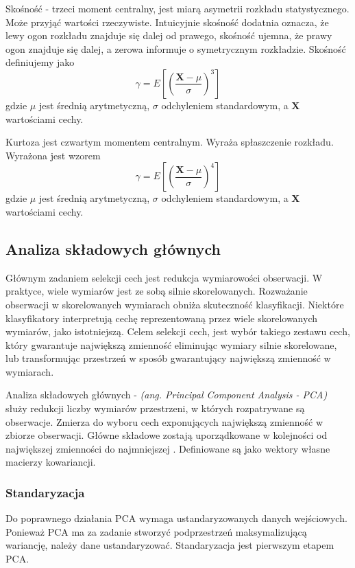\documentclass[a4paper,12pt,twoside,openany]{report}
\newcommand{\ang}[1]{\textit{(ang. #1)}}
\renewcommand{\vec}[1]{\bm{#1}}
\begin{document}
Skośność - trzeci moment centralny, jest miarą asymetrii rozkładu statystycznego. 
Może przyjąć wartości rzeczywiste.
Intuicyjnie skośność dodatnia oznacza, że lewy ogon rozkładu znajduje się dalej od prawego,
skośność ujemna, że prawy ogon znajduje się dalej,
a zerowa informuje o symetrycznym rozkładzie.
Skośność definiujemy jako
\begin{equation}
	\gamma = E \left [ \left (  \frac{\vec X - \mu}{ \sigma }   \right )^3 \right ]
\end{equation}
gdzie $\mu$ jest średnią arytmetyczną, $\sigma$ odchyleniem standardowym, a $\vec X$ wartościami cechy.

Kurtoza jest czwartym momentem centralnym.
Wyraża spłaszczenie rozkładu. 
Wyrażona jest wzorem
\begin{equation}
	\gamma = E \left [ \left (  \frac{\vec X - \mu}{ \sigma }   \right )^4 \right ]
\end{equation}
gdzie $\mu$ jest średnią arytmetyczną, $\sigma$ odchyleniem standardowym, a $\vec X$ wartościami cechy.
\subsection{Analiza składowych głównych}\label{sec:pca}
Głównym zadaniem selekcji cech jest redukcja wymiarowości obserwacji.
W praktyce, wiele wymiarów jest ze sobą silnie skorelowanych.
Rozważanie obserwacji w skorelowanych wymiarach obniża skuteczność klasyfikacji.
Niektóre klasyfikatory interpretują cechę reprezentowaną przez wiele skorelowanych wymiarów, jako istotniejszą.
Celem selekcji cech, jest wybór takiego zestawu cech, który gwarantuje największą zmienność eliminując wymiary silnie skorelowane, 
lub transformując przestrzeń w sposób gwarantujący największą zmienność w wymiarach.

Analiza składowych głównych - \ang{Principal Component Analysis - PCA} służy redukcji liczby wymiarów przestrzeni,
w których rozpatrywane są obserwacje.
Zmierza do wyboru cech exponujących największą zmienność w zbiorze obserwacji.
Główne składowe zostają uporządkowane w kolejności od największej zmienności do najmniejszej \cite{Bro2014}.
Definiowane są jako wektory własne macierzy kowariancji.

\subsubsection{Standaryzacja}
Do poprawnego działania PCA wymaga ustandaryzowanych danych wejściowych.
Ponieważ PCA ma za zadanie stworzyć podprzestrzeń maksymalizującą wariancję,
należy dane ustandaryzować.
Standaryzacja jest pierwszym etapem PCA.
\end{document}
